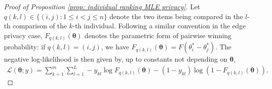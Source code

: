 \documentclass[letterpaper,12pt]{article}
\numberwithin{equation}{section}
\theoremstyle{plain}
\numberwithin{Theorem}{section}
\numberwithin{corollary}{section}
\numberwithin{proposition}{section}
\numberwithin{Lemma}{section}
{
	\theoremstyle{definition}
	\newtheorem{Definition}{Definition}
	\newtheorem{example}{Example}
	\numberwithin{example}{section}
	\newtheorem{fact}{Fact}
	\numberwithin{fact}{section}
	\newtheorem{remark}{Remark}
}
\newcommand{\1}{\mathbbm{1}}
\def\bth{{\boldsymbol{\theta}}}
\begin{document}
\begin{proof}[Proof of Proposition \ref{prop: individual ranking MLE privacy}]
	Let $q(k, l) \in \{(i, j): 1 \leq i < j \leq n\}$ denote the two items being compared in the $l$-th comparison of the $k$-th individual. Following a similar convention in the edge privacy case, $F_{q(k, l)}(\bth)$ denotes the parametric form of pairwise winning probability: if $q(k, l) =(i, j)$, we have $F_{q(k, l)}(\bth) = F(\theta^*_i - \theta^*_j)$. The negative log-likelihood is then given by, up to constants not depending on $\bth$, 
	\begin{align}\label{eq: individual dp ranking likelihood equation}
		\mathcal L(\bth; y) = \sum_{k=1}^m \sum_{l = 1}^L -y_{kl}\log F_{q(k, l)}(\bth) - (1-y_{kl})\log(1 - F_{q(k, l)}(\bth)).
	\end{align}
	

\end{proof}
\end{document}
